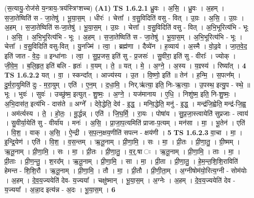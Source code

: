 \documentclass[17pt]{extarticle}
\begin{document}
                  \newline
                      (स॒त्यायु॒-रोज॑से य॒न्त्राय॒-त्रय॑स्त्रिꣳशच्च)  \textbf{(A1)} \newline \newline
                                \textbf{ TS 1.6.2.1} \newline
                  ध्रु॒वः । अ॒सि॒ । ध्रु॒वः । अ॒हम् । स॒जा॒तेष्विति॑ स - जा॒तेषु॑ । भू॒या॒स॒म् । धीरः॑ । चेत्ता᳚ । व॒सु॒विदिति॑ वसु - वित् । उ॒ग्रः । अ॒सि॒ । उ॒ग्रः । अ॒हम् । स॒जा॒तेष्विति॑ स-जा॒तेषु॑ । भू॒या॒स॒म् । उ॒ग्रः । चेत्ता᳚ । व॒सु॒विदिति॑ वसु - वित् । अ॒भि॒भूरित्य॑भि - भूः । अ॒सि॒ । अ॒भि॒भूरित्य॑भि - भूः । अ॒हम् । स॒जा॒तेष्विति॑ स - जा॒तेषु॑ । भू॒या॒स॒म् । अ॒भि॒भूरित्य॑भि - भूः । चेत्ता᳚ । व॒सु॒विदिति॑ वसु-वित् । यु॒नज्मि॑ । त्वा॒ । ब्रह्म॑णा । दैव्ये॑न । ह॒व्याय॑ । अ॒स्मै । वो॒ढ॒वे । जा॒त॒वे॒द॒ इति॑ जात - वे॒दः॒ ॥ इन्धा॑नाः । त्वा॒ । सु॒प्र॒जस॒ इति॑ सु - प्र॒जसः॑ । सु॒वीरा॒ इति॑ सु - वीराः᳚ । ज्योक् । जी॒वे॒म॒ । ब॒लि॒हृत॒ इति॑ बलि - हृतः॑ । व॒यम् । ते॒ ॥ यत् । मे॒ । अ॒ग्ने॒ । अ॒स्य । य॒ज्ञ्स्य॑ । रिष्या᳚त् । \textbf{  4} \newline
                  \newline
                                \textbf{ TS 1.6.2.2} \newline
                  यत् । वा॒ । स्कन्दा᳚त् । आज्य॑स्य । उ॒त । वि॒ष्णो॒ इति॑ ॥ तेन॑ । ह॒न्मि॒ । स॒पत्न᳚म् । दु॒र्म॒रा॒युमिति॑ दुः - म॒रा॒युम् । एति॑ । ए॒न॒म् । द॒धा॒मि॒ । निर्.ऋ॑त्या॒ इति॒ निः-ऋ॒त्याः॒ । उ॒पस्थ॒ इत्यु॒प - स्थे॒ ॥ भूः । भुवः॑ । सुवः॑ । उच्छु॑ष्म॒ इत्युत् - शु॒ष्मः॒ । अ॒ग्ने॒ । यज॑मानाय । ए॒धि॒ । निशु॑ष्म॒ इति॒ नि-शु॒ष्मः॒ । अ॒भि॒दास॑त॒ इत्य॑भि - दास॑ते ॥ अग्ने᳚ । देवे॒द्धेति॒ देव॑ - इ॒द्ध॒ । मन्वि॒द्धेति॒ मनु॑ - इ॒द्ध॒ । मन्द्र॑जि॒ह्वेति॒ मन्द्र॑-जि॒ह्व॒ । अम॑र्त्यस्य । ते॒ । हो॒तः॒ । मू॒र्द्धन्न् । एति॑ । जि॒घ॒र्मि॒ । रा॒यः । पोषा॑य । सु॒प्र॒जा॒स्त्वायेति॑ सुप्रजाः - त्वाय॑ । सु॒वीर्या॒येति॑ सु - वीर्या॑य । मनः॑ । अ॒सि॒ । प्रा॒जा॒प॒त्यमिति॑ प्राजा-प॒त्यम् । मन॑सा । मा॒ । भू॒तेन॑ । एति॑ । वि॒श॒ । वाक् । अ॒सि॒ । ऐ॒न्द्री । स॒प॒त्न॒क्षय॒णीति॑ सपत्न - क्षय॑णी । \textbf{  5} \newline
                  \newline
                                \textbf{ TS 1.6.2.3} \newline
                  वा॒चा । मा॒ । इ॒न्द्रि॒येण॑ । एति॑ । वि॒श॒ । व॒स॒न्तम् । ऋ॒तू॒नाम् । प्री॒णा॒मि॒ । सः । मा॒ । प्री॒तः । प्री॒णा॒तु॒ । ग्री॒ष्मम् । ऋ॒तू॒नाम् । प्री॒णा॒मि॒ । सः । मा॒ । प्री॒तः । प्री॒णा॒तु॒ । व॒र्॒.षा ः । ऋ॒तू॒नाम् । प्री॒णा॒मि॒ । ताः । मा॒ । प्री॒ताः । प्री॒ण॒न्तु॒ । श॒रद᳚म् । ऋ॒तू॒नाम् । प्री॒णा॒मि॒ । सा । मा॒ । प्री॒ता । प्री॒णा॒तु॒ । हे॒म॒न्त॒शि॒शि॒राविति॑ हेमन्त - शि॒शि॒रौ । ऋ॒तू॒नाम् । प्री॒णा॒मि॒ । तौ । मा॒ । प्री॒तौ । प्री॒णी॒ता॒म् । अ॒ग्नीषोम॑यो॒रित्य॒ग्नी - सोम॑योः । अ॒हम् । दे॒व॒य॒ज्ययेति॑ देव- य॒ज्यया᳚ । चक्षु॑ष्मान् । भू॒या॒स॒म् । अ॒ग्नेः । अ॒हम् । दे॒व॒य॒ज्ययेति॑ देव - य॒ज्यया᳚ । अ॒न्ना॒द इत्य॑न्न - अ॒दः । भू॒या॒स॒म् । \textbf{  6} \newline
\end{document}
